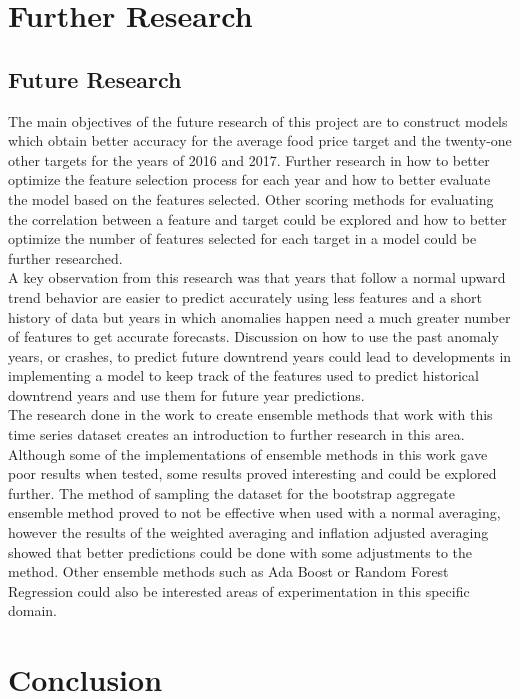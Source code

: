 \documentclass[12pt]{dalthesis}
\begin{document}
\chapter{Further Research}

\section{Future Research}

The main objectives of the future research of this project are to construct models which obtain better accuracy for the average food price target and the twenty-one other targets for the years of 2016 and 2017. Further research in how to better optimize the feature selection process for each year and how to better evaluate the model based on the features selected. Other scoring methods for evaluating the correlation between a feature and target could be explored and how to better optimize the number of features selected for each target in a model could be further researched.\\

A key observation from this research was that years that follow a normal upward trend behavior are easier to predict accurately using less features and a short history of data but years in which anomalies happen need a much greater number of features to get accurate forecasts. Discussion on how to use the past anomaly years, or crashes, to predict future downtrend years could lead to developments in implementing a model to keep track of the features used to predict historical downtrend years and use them for future year predictions.\\

The research done in the work to create ensemble methods that work with this time series dataset creates an introduction to further research in this area. Although some of the implementations of ensemble methods in this work gave poor results when tested, some results proved interesting and could be explored further. The method of sampling the dataset for the bootstrap aggregate ensemble method proved to not be effective when used with a normal averaging, however the results of the weighted averaging and inflation adjusted averaging showed that better predictions could be done with some adjustments to the method. Other ensemble methods such as Ada Boost or Random Forest Regression could also be interested areas of experimentation in this specific domain.


\chapter{Conclusion}
\end{document}
